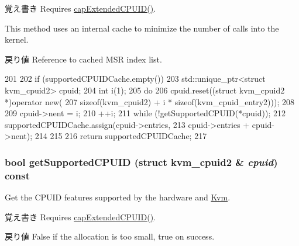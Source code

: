 \begin{DoxyNote}{覚え書き}
Requires \hyperlink{classKvm_a6db5aefbe1a9535f5124ef07a04e23a5}{capExtendedCPUID()}.

This method uses an internal cache to minimize the number of calls into the kernel.
\end{DoxyNote}
\begin{DoxyReturn}{戻り値}
Reference to cached MSR index list. 
\end{DoxyReturn}



\begin{DoxyCode}
201 {
202     if (supportedCPUIDCache.empty()) {
203         std::unique_ptr<struct kvm_cpuid2> cpuid;
204         int i(1);
205         do {
206             cpuid.reset((struct kvm_cpuid2 *)operator new(
207                             sizeof(kvm_cpuid2) + i * sizeof(kvm_cpuid_entry2)));
208 
209             cpuid->nent = i;
210             ++i;
211         } while (!getSupportedCPUID(*cpuid));
212         supportedCPUIDCache.assign(cpuid->entries,
213                                    cpuid->entries + cpuid->nent);
214     }
215 
216     return supportedCPUIDCache;
217 }
\end{DoxyCode}
\hypertarget{classKvm_a74bec0050eeeffd21d5f85cb929c802b}{
\subsubsection[{getSupportedCPUID}]{\setlength{\rightskip}{0pt plus 5cm}bool getSupportedCPUID (struct kvm\_\-cpuid2 \& {\em cpuid}) const}}
\label{classKvm_a74bec0050eeeffd21d5f85cb929c802b}
Get the CPUID features supported by the hardware and \hyperlink{classKvm}{Kvm}.

\begin{DoxyNote}{覚え書き}
Requires \hyperlink{classKvm_a6db5aefbe1a9535f5124ef07a04e23a5}{capExtendedCPUID()}.
\end{DoxyNote}
\begin{DoxyReturn}{戻り値}
False if the allocation is too small, true on success. 
\end{DoxyReturn}



